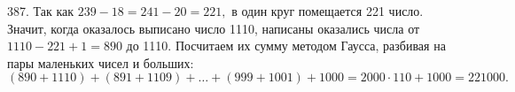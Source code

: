 387. Так как $239-18=241-20=221,$ в один круг помещается 221 число. Значит, когда оказалось выписано число 1110, написаны оказались числа от $1110-221+1=890$ до 1110. Посчитаем их сумму методом Гаусса, разбивая на пары маленьких чисел и больших: $(890+1110)+(891+1109)+\ldots+(999+1001)+1000=
2000\cdot110+1000=221000.$\\

